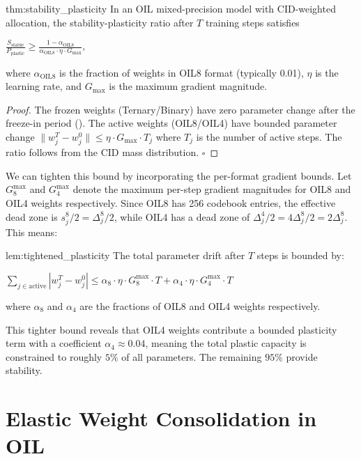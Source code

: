 \begin{mythm}{thm:stability_plasticity}
In an OIL mixed-precision model with CID-weighted allocation, the stability-plasticity ratio after $T$ training steps satisfies

$\displaystyle \frac{S_{\text{stable}}}{P_{\text{plastic}}} \geq \frac{1 - \alpha_{\text{OIL8}}}{\alpha_{\text{OIL8}} \cdot \eta \cdot G_{\max}},$

where $\alpha_{\text{OIL8}}$ is the fraction of weights in OIL8 format (typically 0.01), $\eta$ is the learning rate, and $G_{\max}$ is the maximum gradient magnitude.
\end{mythm}

\begin{proof}
The frozen weights (Ternary/Binary) have zero parameter change after the freeze-in period (). The active weights (OIL8/OIL4) have bounded parameter change $\|w_j^T - w_j^0\| \leq \eta \cdot G_{\max} \cdot T_j$ where $T_j$ is the number of active steps. The ratio follows from the CID mass distribution. $\square$
\end{proof}

We can tighten this bound by incorporating the per-format gradient bounds. Let $G_8^{\max}$ and $G_4^{\max}$ denote the maximum per-step gradient magnitudes for OIL8 and OIL4 weights respectively. Since OIL8 has 256 codebook entries, the effective dead zone is $s_j^8 / 2 = \Delta_j^8 / 2$, while OIL4 has a dead zone of $\Delta_j^4 / 2 = 4\Delta_j^8 / 2 = 2\Delta_j^8$. This means:

\begin{mylemma}{lem:tightened_plasticity}
The total parameter drift after $T$ steps is bounded by:

$\displaystyle \sum_{j \in \text{active}} |w_j^T - w_j^0| \leq \alpha_8 \cdot \eta \cdot G_8^{\max} \cdot T + \alpha_4 \cdot \eta \cdot G_4^{\max} \cdot T$

where $\alpha_8$ and $\alpha_4$ are the fractions of OIL8 and OIL4 weights respectively.
\end{mylemma}

This tighter bound reveals that OIL4 weights contribute a bounded plasticity term with a coefficient $\alpha_4 \approx 0.04$, meaning the total plastic capacity is constrained to roughly $5\%$ of all parameters. The remaining $95\%$ provide stability.

\section{Elastic Weight Consolidation in OIL}
\label{sec:ewc_oil}

